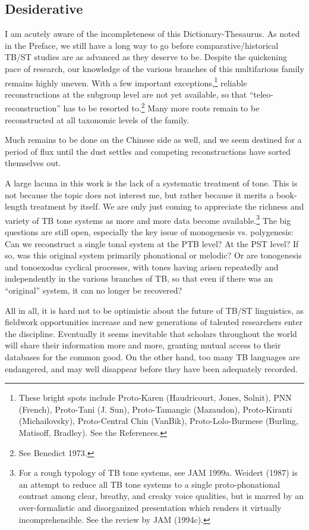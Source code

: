 \subsection{Desiderative}
I am acutely aware of the incompleteness of this Dictionary-Thesaurus. As noted in the Preface, we still have a long way to go before comparative/historical TB/ST studies are as advanced as they deserve to be. Despite the quickening pace of research, our knowledge of the various branches of this multifarious family remains highly uneven. With a few important exceptions,\footnote{These bright spots include Proto-Karen (Haudricourt, Jones, Solnit), PNN (French), Proto-Tani (J. Sun), Proto-Tamangic (Mazaudon), Proto-Kiranti (Michailovsky), Proto-Central Chin (VanBik), Proto-Lolo-Burmese (Burling, Matisoff, Bradley). See the References.} reliable reconstructions at the subgroup level are not yet available, so that “teleo-reconstruction” has to be resorted to.\footnote{See Benedict 1973.} Many more roots remain to be reconstructed at all taxonomic levels of the family.

Much remains to be done on the Chinese side as well, and we seem destined for a period of flux until the dust settles and competing reconstructions have sorted themselves out.

A large lacuna in this work is the lack of a systematic treatment of tone. This is not because the topic does not interest me, but rather because it merits a book-length treatment by itself. We are only just coming to appreciate the richness and variety of TB tone systems as more and more data become available.\footnote{For a rough typology of TB tone systems, see JAM 1999a. Weidert (1987) is an attempt to reduce all TB tone systems to a single proto-phonational contrast among clear, breathy, and creaky voice qualities, but is marred by an over-formalistic and disorganized presentation which renders it virtually incomprehensible. See the review by JAM (1994c).} The big questions are still open, especially the key issue of monogenesis vs. polygenesis: Can we reconstruct a single tonal system at the PTB level? At the PST level? If so, was this original system primarily phonational or melodic? Or are tonogenesis and tonoexodus cyclical processes, with tones having arisen repeatedly and independently in the various branches of TB, so that even if there was an “original” system, it can no longer be recovered?

All in all, it is hard not to be optimistic about the future of TB/ST linguistics, as fieldwork opportunities increase and new generations of talented researchers enter the discipline. Eventually it seems inevitable that scholars throughout the world will share their information more and more, granting mutual access to their databases for the common good. On the other hand, too many TB languages are endangered, and may well disappear before they have been adequately recorded.

